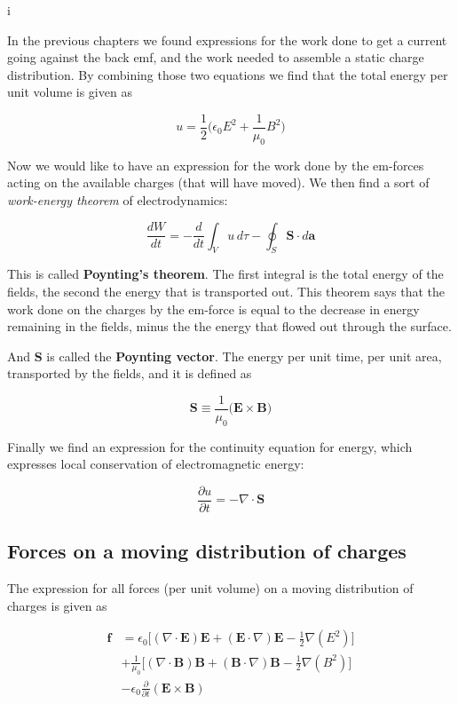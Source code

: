 i\documentclass[a4paper]{article}
\begin{document}
In the previous chapters we found expressions for the work done to get a current going against the back emf, and the work needed to assemble a static charge distribution. By combining those two equations we find that the total energy per unit volume is given as

\begin{equation}
    u=\frac{1}{2}\bigg(\epsilon_0E^2+\frac{1}{\mu_0}B^2\bigg)
\end{equation}

Now we would like to have an expression for the work done by the em-forces acting on the available charges (that will have moved). We then find a sort of \textit{work-energy theorem} of electrodynamics:

\begin{equation}
    \frac{dW}{dt}=-\frac{d}{dt}\int_V u\,d\tau - \oint_S \bm{S}\cdot d\bm{a}
\end{equation}

This is called \textbf{Poynting's theorem}. The first integral is the total energy of the fields, the second the energy that is transported out. This theorem says that the work done on the charges by the em-force is equal to the decrease in energy remaining in the fields, minus the the energy that flowed out through the surface. 

\bigskip

And $\bm{S}$ is called the \textbf{Poynting vector}. The energy per unit time, per unit area, transported by the fields, and it is defined as

\begin{equation}
    \bm{S}\equiv \frac{1}{\mu_0}\big(\bm{E}\times\bm{B}\big)
\end{equation}

Finally we find an expression for the continuity equation for energy, which expresses local conservation of electromagnetic energy:

\begin{equation}
    \frac{\partial u}{\partial t}=-\nabla\cdot\bm{S}
\end{equation}

\subsection{Forces on a moving distribution of charges}

The expression for all forces (per unit volume) on a moving distribution of charges is given as

\begin{align}
    \bm{f}&=\epsilon_0\bigg[(\nabla\cdot\bm{E})\bm{E}+(\bm{E}\cdot\nabla)\bm{E}-\frac{1}{2}\nabla(E^2)\bigg] \\
          &+ \frac{1}{\mu_0}\bigg[(\nabla\cdot\bm{B})\bm{B}+(\bm{B}\cdot\nabla)\bm{B}-\frac{1}{2}\nabla(B^2)\bigg] \\
          &- \epsilon_0\frac{\partial}{\partial t}(\bm{E}\times\bm{B})
\end{align}
\end{document}
